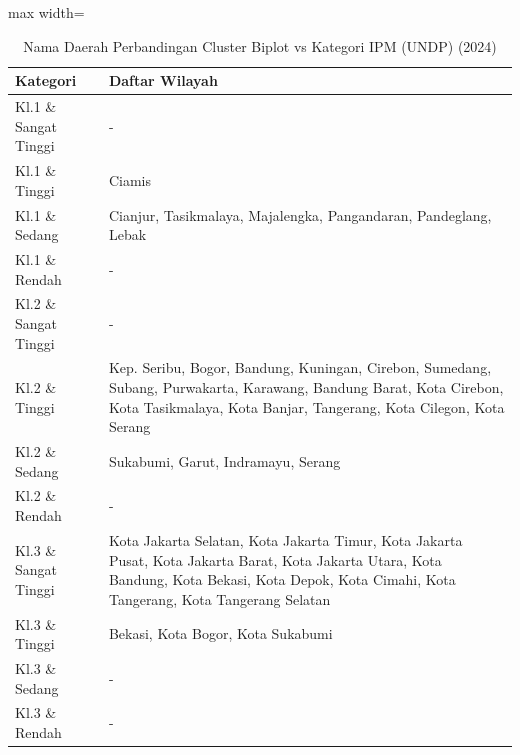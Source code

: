 \begin{table}[H]
\centering
\caption{Nama Daerah Perbandingan Cluster Biplot vs Kategori IPM (UNDP) (2024)} \label{tab:crossname2024}
\begin{adjustbox}{max width=\textwidth}
\begin{tabular}{|p{4cm}|p{10cm}|}
\hline
\textbf{Kategori} & \textbf{Daftar Wilayah} \\
\hline
Kl.1 \& Sangat Tinggi & - \\
\hline
Kl.1 \& Tinggi & Ciamis \\
\hline
Kl.1 \& Sedang & Cianjur, Tasikmalaya, Majalengka, Pangandaran, Pandeglang, Lebak \\
\hline
Kl.1 \& Rendah & - \\
\hline
Kl.2 \& Sangat Tinggi & - \\
\hline
Kl.2 \& Tinggi & Kep. Seribu, Bogor, Bandung, Kuningan, Cirebon, Sumedang, Subang, Purwakarta, Karawang, Bandung Barat, Kota Cirebon, Kota Tasikmalaya, Kota Banjar, Tangerang, Kota Cilegon, Kota Serang \\
\hline
Kl.2 \& Sedang & Sukabumi, Garut, Indramayu, Serang \\
\hline
Kl.2 \& Rendah & - \\
\hline
Kl.3 \& Sangat Tinggi & Kota Jakarta Selatan, Kota Jakarta Timur, Kota Jakarta Pusat, Kota Jakarta Barat, Kota Jakarta Utara, Kota Bandung, Kota Bekasi, Kota Depok, Kota Cimahi, Kota Tangerang, Kota Tangerang Selatan \\
\hline
Kl.3 \& Tinggi & Bekasi, Kota Bogor, Kota Sukabumi \\
\hline
Kl.3 \& Sedang & - \\
\hline
Kl.3 \& Rendah & - \\
\hline
\end{tabular}
\end{adjustbox}
\end{table}